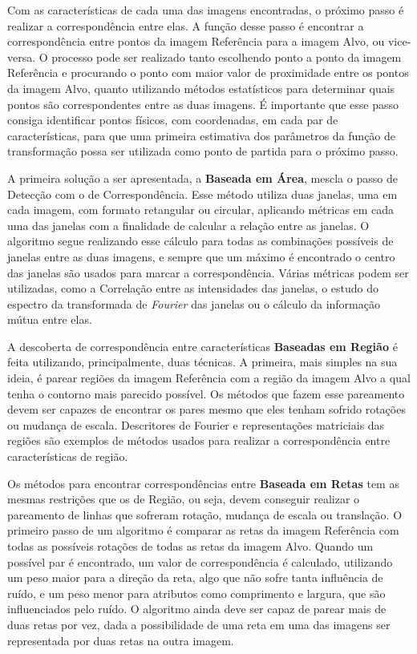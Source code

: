     Com as características de cada uma das imagens encontradas, o próximo passo é realizar a correspondência entre elas.
A função desse passo é encontrar a correspondência entre pontos da imagem Referência para a imagem Alvo, ou vice-versa.
O processo pode ser realizado tanto escolhendo ponto a ponto da imagem Referência e procurando o ponto com maior valor
de proximidade entre os pontos da imagem Alvo, quanto utilizando métodos estatísticos para determinar quais pontos são
correspondentes entre as duas imagens. É importante que esse passo consiga identificar pontos físicos, com coordenadas,
em cada par de características, para que uma primeira estimativa dos parâmetros da função de transformação possa ser
utilizada como ponto de partida para o próximo passo.

    A primeira solução a ser apresentada, a \textbf{Baseada em Área}, mescla o passo de Detecção com o de
Correspondência. Esse método utiliza duas janelas, uma em cada imagem, com formato retangular ou circular, aplicando
métricas em cada uma das janelas com a finalidade de calcular a relação entre as janelas. O algoritmo segue realizando
esse cálculo para todas as combinações possíveis de janelas entre as duas imagens, e sempre que um máximo é encontrado
o centro das janelas são usados para marcar a correspondência. Várias métricas podem ser utilizadas, como a
Correlação entre as intensidades das janelas, o estudo do espectro da transformada de \textit{Fourier} das janelas ou
o cálculo da informação mútua entre elas.

    A descoberta de correspondência entre características \textbf{Baseadas em Região} é feita utilizando, principalmente, duas
técnicas. A primeira, mais simples na sua ideia, é parear regiões da imagem Referência com a região da imagem Alvo a
qual tenha o contorno mais parecido possível. Os métodos que fazem esse pareamento devem ser capazes de encontrar os
pares mesmo que eles tenham sofrido rotações ou mudança de escala. Descritores de Fourier e representações matriciais
das regiões são exemplos de métodos usados para realizar a correspondência entre características de região.

    Os métodos para encontrar correspondências entre \textbf{Baseada em Retas} tem as mesmas restrições que os
de Região, ou seja, devem conseguir realizar o pareamento de linhas que sofreram rotação, mudança de escala ou
translação. O primeiro passo de um algoritmo é comparar as retas da imagem Referência com todas as possíveis rotações
de todas as retas da imagem Alvo. Quando um possível par é encontrado, um valor de correspondência é calculado,
utilizando um peso maior para a direção da reta, algo que não sofre tanta influência de ruído, e um peso menor para
atributos como comprimento e largura, que são influenciados pelo ruído. O algoritmo ainda deve ser capaz de parear mais
de duas retas por vez, dada a possibilidade de uma reta em uma das imagens ser representada por duas retas na outra
imagem.



